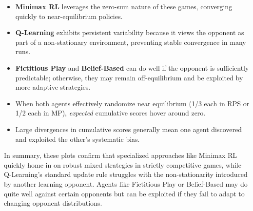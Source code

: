 \documentclass[11pt]{article}
\begin{document}
\begin{itemize}
    \item \textbf{Minimax RL} leverages the zero-sum nature of these 
    games, converging quickly to near-equilibrium policies. 
    \item \textbf{Q-Learning} exhibits persistent variability because 
    it views the opponent as part of a non-stationary environment, 
    preventing stable convergence in many runs.
    \item \textbf{Fictitious Play} and \textbf{Belief-Based} can do 
    well if the opponent is sufficiently predictable; otherwise, they 
    may remain off-equilibrium and be exploited by more adaptive 
    strategies.
    \item When both agents effectively randomize near equilibrium 
    (1/3 each in RPS or 1/2 each in MP), \emph{expected} cumulative 
    scores hover around zero. 
    \item Large divergences in cumulative scores generally mean one 
    agent discovered and exploited the other's systematic bias.
\end{itemize}

In summary, these plots confirm that specialized approaches like Minimax 
RL quickly home in on robust mixed strategies in strictly competitive 
games, while Q-Learning’s standard update rule struggles with the 
non-stationarity introduced by another learning opponent. Agents like 
Fictitious Play or Belief-Based may do quite well against certain 
opponents but can be exploited if they fail to adapt to changing 
opponent distributions.
\end{document}
